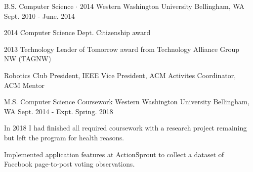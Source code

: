 \documentclass[11pt, a4paper]{awesome-cv}
\begin{document}
\begin{cventries}
  \cventry
  {B.S. Computer Science $\cdot$ 2014} %
  {Western Washington University} %
  {Bellingham, WA} %
  {Sept. 2010 - June. 2014} %
  {
  \begin{cvitems} %
    \item {2014 Computer Science Dept. Citizenship award}
    \item {2013 Technology Leader of Tomorrow award from Technology Alliance Group NW (TAGNW)}
    \item {Robotics Club President, IEEE Vice President, ACM Activites Coordinator, ACM Mentor}
  \end{cvitems}
  }
  {}

  \cventry
  {M.S. Computer Science Coursework} %
  {Western Washington University} %
  {Bellingham, WA} %
  {Sept. 2014 - Expt. Spring. 2018} %
  {
  \begin{cvitems} %
    \item {In 2018 I had finished all required coursework with a research project remaining but left the program for health reasons.}
    \item {Implemented application features at ActionSprout to collect a dataset of Facebook page-to-post voting observations.}
  \end{cvitems}
  }
  {}

\end{cventries}
\end{document}
